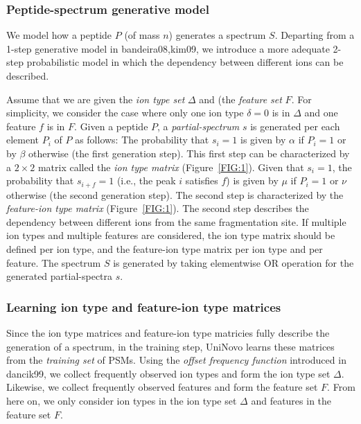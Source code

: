 \subsubsection{Peptide-spectrum generative model} 

We model how a peptide $P$ (of mass $n$) generates  a spectrum $S$. Departing from a 1-step generative model in  \cite{unv}{bandeira08,kim09}, we introduce a more adequate 2-step probabilistic model in which the dependency between different ions can be described. 

Assume that we are given the  {\em ion type set} $\Delta$ and  (the {\em feature set} $F$.  For simplicity, we consider the case where only one ion type $\delta=0$ is in $\Delta$ and one feature $f$ is in $F$. Given a peptide $P$, a {\em partial-spectrum} $s$ is generated per  each element $P_i$ of $P$ as follows: The probability that $s_i=1$ is given by $\alpha$ if $P_i=1$ or by $\beta$ otherwise (the first generation step). This first step can be characterized by a $2\times2$ matrix called the {\em ion type matrix} (Figure~\ref{FIG:1}). Given that $s_i=1$,  the probability that $s_{i+f}=1$ (i.e., the peak $i$ satisfies $f$) is given by  $\mu$ if $P_i=1$  or $\nu$ otherwise (the second generation step). The second step is characterized by the {\em feature-ion type matrix} (Figure~\ref{FIG:1}).
The second step  describes the dependency between different ions 
from the same fragmentation site.  If multiple ion types and multiple features are considered, the ion type matrix should be defined per ion type, and the feature-ion type matrix per ion type and per feature.  The spectrum $S$ is generated by taking elementwise OR operation for the generated  partial-spectra $s$. %


\subsubsection{Learning ion type and feature-ion type matrices} 

Since the ion type matrices and feature-ion type matricies fully describe the generation of a spectrum, in the training step, UniNovo learns these matrices from the {\em training set} of PSMs. 
Using the {\em offset frequency function} introduced in \cite{unv}{dancik99}, we collect frequently observed ion types and form the ion type set $\Delta$. Likewise, we collect frequently observed features and form the feature set $F$. From here on, we only consider ion types in the ion type set $\Delta$ and features in the feature set $F$.

